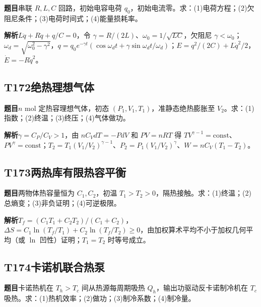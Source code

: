 \textbf{题目}\quad 串联 $R,L,C$ 回路，初始电容电荷 $q_0$，初始电流零。求：(1)电荷方程；(2)欠阻尼条件；(3)电荷时间式；(4)能量损耗率。

\par\textbf{解析}\quad $L\ddot q+R\dot q+q/C=0$，令 $\gamma=R/(2L)$、$\omega_0=1/\sqrt{LC}$，欠阻尼 $\gamma<\omega_0$；$\omega_d=\sqrt{\omega_0^2-\gamma^2}$，$q=q_0e^{-\gamma t}(\cos\omega_dt+\gamma\sin\omega_dt/\omega_d)$；$E=q^2/(2C)+L\dot q^2/2$，$\dot E=-R\dot q^2$。

\par\medskip

\subsection*{T172\quad 绝热理想气体}

\textbf{题目}\quad $n$ mol 定热容理想气体，初态 $(P_1,V_1,T_1)$，准静态绝热膨胀至 $V_2$。求：(1)指数；(2)终温；(3)终压；(4)气体做功。

\par\textbf{解析}\quad $\gamma=C_P/C_V>1$，由 $nC_VdT=-PdV$ 和 $PV=nRT$ 得 $TV^{\gamma-1}=\mathrm{const}$、$PV^\gamma=\mathrm{const}$；$T_2=T_1(V_1/V_2)^{\gamma-1}$、$P_2=P_1(V_1/V_2)^\gamma$、$W=nC_V(T_1-T_2)$。

\par\medskip

\subsection*{T173\quad 两热库有限热容平衡}

\textbf{题目}\quad 两物体热容量恒为 $C_1,C_2$，初温 $T_1>T_2>0$，隔热接触。求：(1)终温；(2)总熵变；(3)非负证明；(4)可逆极限。

\par\textbf{解析}\quad $T_f=(C_1T_1+C_2T_2)/(C_1+C_2)$，$\Delta S=C_1\ln(T_f/T_1)+C_2\ln(T_f/T_2)\ge0$，由加权算术平均不小于加权几何平均（或 $\ln$ 凹性）证明；$T_1=T_2$ 时等号成立。

\par\medskip

\subsection*{T174\quad 卡诺机联合热泵}

\textbf{题目}\quad 卡诺热机在 $T_h>T_c$ 间从热源每周期吸热 $Q_h$，输出功驱动反卡诺制冷机在 $T_c$ 吸热。求：(1)热机效率；(2)做功；(3)制冷系数；(4)制冷量。

